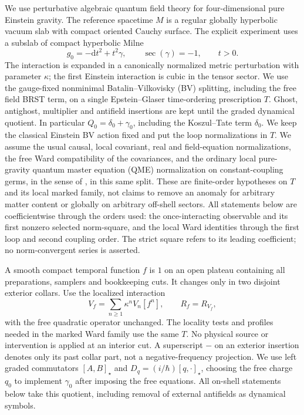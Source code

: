 \documentclass[11pt]{article}
\theoremstyle{remark}
\newcommand{\dd}{\mathrm d}
\begin{document}
We use perturbative algebraic quantum field theory for four-dimensional pure Einstein gravity. The reference spacetime \(M\) is a regular globally hyperbolic vacuum slab with compact oriented Cauchy surface. The explicit experiment uses a subslab of compact hyperbolic Milne
\[
       g_0=-\dd t^2+t^2\gamma,\qquad
       \operatorname{sec}(\gamma)=-1,\qquad t>0 .
\]
The interaction is expanded in a canonically normalized metric perturbation with parameter \(\kappa\); the first Einstein interaction is cubic in the tensor sector. We use the gauge-fixed nonminimal Batalin--Vilkovisky (BV) splitting, including the free field BRST term, on a single Epstein--Glaser time-ordering prescription \(T\). Ghost, antighost, multiplier and antifield insertions are kept until the graded dynamical quotient. In particular \(Q_0=\delta_0+\gamma_0\), including the Koszul--Tate term \(\delta_0\). We keep the classical Einstein BV action fixed and put the loop normalizations in \(T\). We assume the usual causal, local covariant, real and field-equation normalizations, the free Ward compatibility of the covariances, and the ordinary local pure-gravity quantum master equation (QME) normalization on constant-coupling germs, in the sense of \cite[Sec.~3.4]{BFR}, in this same split. These are finite-order hypotheses on \(T\) and its local marked family, not claims to remove an anomaly for arbitrary matter content or globally on arbitrary off-shell sectors. All statements below are coefficientwise through the orders used: the once-interacting observable and its first nonzero selected norm-square, and the local Ward identities through the first loop and second coupling order. The strict square refers to its leading coefficient; no norm-convergent series is asserted.

A smooth compact temporal function \(f\) is \(1\) on an open plateau containing all preparations, samplers and bookkeeping cuts. It changes only in two disjoint exterior collars. Use the localized interaction
\[
           V_f=\sum_{n\geq1}\kappa^n V_n[f^n],
           \qquad R_f=R_{V_f},
\]
with the free quadratic operator unchanged. The locality tests and profiles needed in the marked Ward family use the same \(T\). No physical source or intervention is applied at an interior cut. A superscript \(-\) on an exterior insertion denotes only its past collar part, not a negative-frequency projection. We use left graded commutators \([A,B]_{\star}\) and \(D_q=(i/\hbar)[q,\cdot]_{\star}\), choosing the free charge \(q_0\) to implement \(\gamma_0\) after imposing the free equations. All on-shell statements below take this quotient, including removal of external antifields as dynamical symbols.
\end{document}

